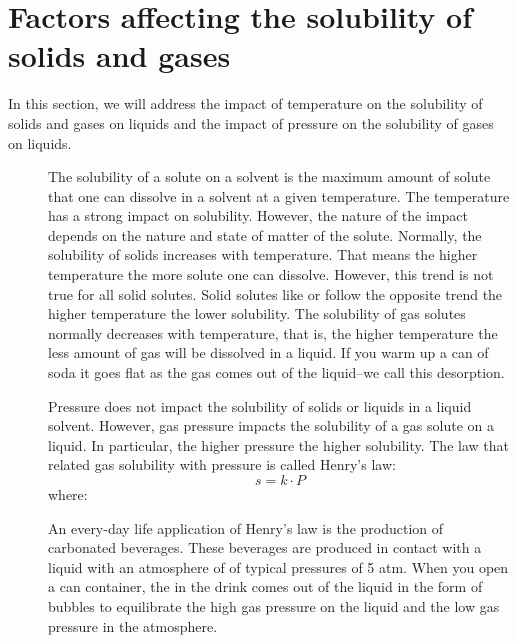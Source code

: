 \documentclass[main.tex]{subfiles}
\newcommand\chapterlabel{physicalsolutions}
\begin{document}
\section{Factors affecting the solubility of solids and gases}
In this section, we will address the impact of temperature on the solubility of solids and gases on liquids and the impact of pressure on the solubility of gases on liquids.
\sloppy 
\begin{description}
\item[] The solubility of a solute on a solvent is the maximum amount of solute that one can dissolve in a solvent at a given temperature. The temperature has a strong impact on solubility. However, the nature of the impact depends on the nature and state of matter of the solute.
Normally, the solubility of solids increases with temperature. That means the higher temperature the more solute one can dissolve. However, this trend is not true for all solid solutes. Solid solutes like  or  follow the opposite trend the higher temperature the lower solubility. 
The solubility of gas solutes normally decreases with temperature, that is, the higher temperature the less amount of gas will be dissolved in a liquid. If you warm up a can of soda it goes flat as the gas comes out of the liquid--we call this desorption. 
\item[] Pressure does not impact the solubility of solids or liquids in a liquid solvent. However, gas pressure impacts the solubility of a gas solute on a liquid. In particular, the higher pressure the higher solubility. The law that related gas solubility with pressure is called Henry's law:
\begin{equation}
\boxed{ s=k\cdot P 	}
\label{\chapterlabel:equation14}
\end{equation}
where:
An every-day life application of Henry's law is the production of carbonated beverages. These beverages are produced in contact with a liquid with an atmosphere of  of typical pressures of 5 atm. When you open a can container, the  in the drink comes out of the liquid in the form of bubbles to equilibrate the high gas pressure on the liquid and the low gas pressure in the atmosphere.
\end{description}
\end{document}
